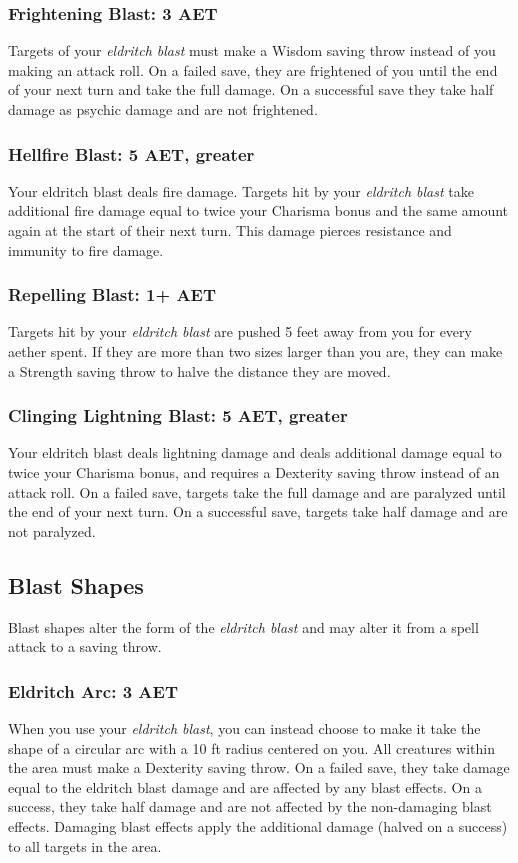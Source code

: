 \subsubsection{Frightening Blast: 3 AET}
Targets of your \textit{eldritch blast} must make a Wisdom saving throw instead of you making an attack roll. On a failed save, they are frightened of you until the end of your next turn and take the full damage. On a successful save they take half damage as psychic damage and are not frightened.

\subsubsection{Hellfire Blast: 5 AET, greater}
Your eldritch blast deals fire damage. Targets hit by your \textit{eldritch blast} take additional fire damage equal to twice your Charisma bonus and the same amount again at the start of their next turn. This damage pierces resistance and immunity to fire damage.

\subsubsection{Repelling Blast: 1+ AET}
Targets hit by your \textit{eldritch blast} are pushed 5 feet away from you for every aether spent. If they are more than two sizes larger than you are, they can make a Strength saving throw to halve the distance they are moved.

\subsubsection{Clinging Lightning Blast: 5 AET, greater}
Your eldritch blast deals lightning damage and deals additional damage equal to twice your Charisma bonus, and requires a Dexterity saving throw instead of an attack roll. On a failed save, targets take the full damage and are paralyzed until the end of your next turn. On a successful save, targets take half damage and are not paralyzed.

\subsection{Blast Shapes}
Blast shapes alter the form of the \textit{eldritch blast} and may alter it from a spell attack to a saving throw.

\subsubsection{Eldritch Arc: 3 AET}
When you use your \textit{eldritch blast}, you can instead choose to make it take the shape of a circular arc with a 10 ft radius centered on you. All creatures within the area must make a Dexterity saving throw. On a failed save, they take damage equal to the eldritch blast damage and are affected by any blast effects. On a success, they take half damage and are not affected by the non-damaging blast effects. Damaging blast effects apply the additional damage (halved on a success) to all targets in the area.


